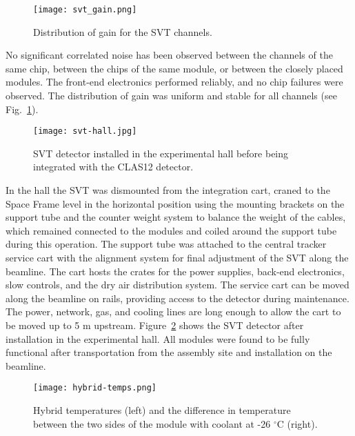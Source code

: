 \begin{figure}[hbt] 
\centering 
\texttt{[image: svt\_gain.png]}
\caption{Distribution of gain for the SVT channels.}
\label{fig:svt_gain}
\end{figure}

No significant correlated noise has been observed between the channels of the same chip, between the chips of the same module, or between the closely placed modules. The front-end electronics performed reliably, and no chip failures were observed. The distribution of gain was uniform and stable for all channels (see Fig.~\ref{fig:svt_gain}). 
 
\begin{figure}[hbt] 
\centering 
\texttt{[image: svt-hall.jpg]}
\caption{SVT detector installed in the experimental hall before being integrated with the CLAS12 detector.}
\label{fig:svt-hall}
\end{figure}

In the hall the SVT was dismounted from the integration cart, craned to the Space Frame level in the horizontal position using the mounting brackets on the support tube and the counter weight system to balance the weight of the cables, which remained connected to the modules and coiled around the support tube during this operation. The support tube was attached to the central tracker service cart with the alignment system for final adjustment of the SVT along the beamline. The cart hosts the crates for the power supplies, back-end electronics, slow controls, and the dry air distribution system. The service cart can be moved along the beamline on rails, providing access to the detector during maintenance. The power, network, gas, and cooling lines are long enough to allow the cart to be moved up to 5 m upstream. Figure~\ref{fig:svt-hall} shows the SVT detector after installation in the experimental hall. All modules were found to be fully functional after transportation from the assembly site and installation on the beamline. 

\begin{figure}[hbt] 
\centering 
\texttt{[image: hybrid-temps.png]}
\caption{Hybrid temperatures (left) and the difference in temperature between the two sides of the module with coolant at -26 $^\circ$C (right).}
\label{fig:hybrid-temps}
\end{figure}

